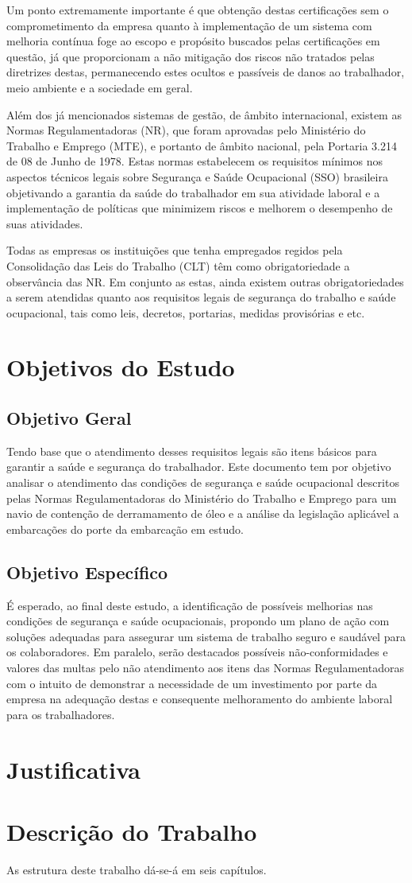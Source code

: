 Um ponto extremamente importante é que obtenção destas certificações sem o comprometimento da empresa quanto à implementação de um sistema com melhoria contínua foge ao escopo e propósito buscados pelas certificações em questão, já que proporcionam a não mitigação dos riscos não tratados pelas diretrizes destas, permanecendo estes ocultos e passíveis de danos ao trabalhador, meio ambiente e a sociedade em geral.

Além dos já mencionados sistemas de gestão, de âmbito internacional, existem as Normas Regulamentadoras (NR), que foram aprovadas pelo Ministério do Trabalho e Emprego (MTE), e portanto de âmbito nacional, pela Portaria 3.214 de 08 de Junho de 1978. Estas normas estabelecem os requisitos mínimos nos aspectos técnicos legais sobre Segurança e Saúde Ocupacional (SSO) brasileira objetivando a garantia da saúde do trabalhador em sua atividade laboral e a implementação de políticas que minimizem riscos e melhorem o desempenho de suas atividades.

Todas as empresas os instituições que tenha empregados regidos pela Consolidação das Leis do Trabalho (CLT) têm como obrigatoriedade a observância das NR. Em conjunto as estas, ainda existem outras obrigatoriedades a serem atendidas quanto aos requisitos legais de segurança do trabalho e saúde ocupacional, tais como leis, decretos, portarias, medidas provisórias e etc.

\section{Objetivos do Estudo}
\subsection{Objetivo Geral}
Tendo base que o atendimento desses requisitos legais são itens básicos para garantir a saúde e segurança do trabalhador. Este documento tem por objetivo analisar o atendimento das condições de segurança e saúde ocupacional descritos pelas Normas Regulamentadoras do Ministério do Trabalho e Emprego para um navio de contenção de derramamento de óleo e a análise da legislação aplicável a embarcações do porte da embarcação em estudo.
\subsection{Objetivo Específico}
É esperado, ao final deste estudo, a identificação de possíveis melhorias nas condições de segurança e saúde ocupacionais, propondo um plano de ação com soluções adequadas para assegurar um sistema de trabalho seguro e saudável para os colaboradores.
Em paralelo, serão destacados possíveis não-conformidades e valores das multas pelo não atendimento aos itens das Normas Regulamentadoras com o intuito de demonstrar a necessidade de um investimento por parte da empresa na adequação destas e consequente melhoramento do ambiente laboral para os trabalhadores.

\section{Justificativa}

\section{Descrição do Trabalho}
As estrutura deste trabalho dá-se-á em seis capítulos.

